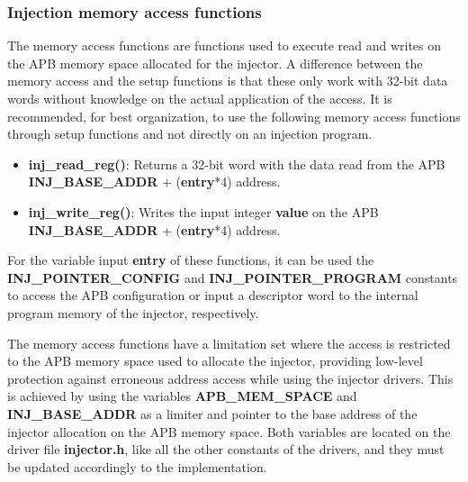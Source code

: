 \subsubsection{Injection memory access functions}
\label{software-drivers-memfunc}

The memory access functions are functions used to execute read and writes on the APB memory space allocated for the injector.
A difference between the memory access and the setup functions is that these only work with 32-bit data words without knowledge on the actual application of the 
access.
It is recommended, for best organization, to use the following memory access functions through setup functions and not directly on an injection program.

\begin{itemize}
  \item \textbf{inj\_read\_reg()}: Returns a 32-bit word with the data read from the APB \textbf{INJ\_BASE\_ADDR} + (\textbf{entry}*4) address.
  \item \textbf{inj\_write\_reg()}: Writes the input integer \textbf{value} on the APB \textbf{INJ\_BASE\_ADDR} + (\textbf{entry}*4) address.
\end{itemize}
\vspace{15px}

For the variable input \textbf{entry} of these functions, it can be used the \textbf{INJ\_POINTER\_CONFIG} and \textbf{INJ\_POINTER\_PROGRAM} constants to 
access the APB configuration or input a descriptor word to the internal program memory of the injector, respectively.

The memory access functions have a limitation set where the access is restricted to the APB memory space used to allocate the injector, providing low-level 
protection against erroneous address access while using the injector drivers. 
This is achieved by using the variables \textbf{APB\_MEM\_SPACE} and \textbf{INJ\_BASE\_ADDR} as a limiter and pointer to the base address of the injector 
allocation on the APB memory space.
Both variables are located on the driver file \textbf{injector.h}, like all the other constants of the drivers, and they must be updated accordingly to the implementation.

